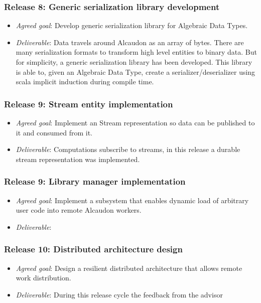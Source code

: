\subsubsection{Release 8: Generic serialization library development}
\begin{itemize}
\item \textit{Agreed goal}: Develop generic serialization library for Algebraic
  Data Types.
\item \textit{Deliverable}: Data travels around Alcaudon as an array of bytes.
  There are many serialization formats to transform high level entities to
  binary data. But for simplicity, a generic serialization library has been
  developed. This library is able to, given an Algebraic Data Type, create a
  serializer/deserializer using scala implicit induction during compile time.
\end{itemize}

\subsubsection{Release 9: Stream entity implementation}
\begin{itemize}
\item \textit{Agreed goal}: Implement an Stream representation so data can be
  published to it and consumed from it.
\item \textit{Deliverable}: Computations subscribe to streams, in this release a durable
  stream representation was implemented.
\end{itemize}

\subsubsection{Release 9: Library manager implementation}
\begin{itemize}
\item \textit{Agreed goal}: Implement a subsystem that enables dynamic load of
  arbitrary user code into remote Alcaudon workers.
\item \textit{Deliverable}: 
\end{itemize}

\subsubsection{Release 10: Distributed architecture design}
\begin{itemize}
\item \textit{Agreed goal}: Design a resilient distributed architecture that
  allows remote work distribution.
\item \textit{Deliverable}: During this release cycle the feedback from the advisor
\end{itemize}

